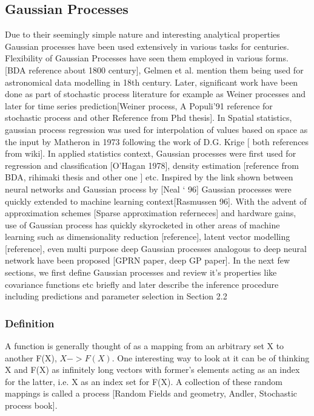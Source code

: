 \subsection{Gaussian Processes}
Due to their seemingly simple nature and interesting analytical properties Gaussian processes have been used extensively in various tasks for centuries. Flexibility of Gaussian Processes have seen them employed in various forms. [BDA reference about 1800 century], Gelmen et al. mention them being used for astronomical data modelling in 18th century. Later, significant work have been done as part of stochastic process literature for example as Weiner processes and later for time series prediction[Weiner process, A Populi’91 reference for stochastic process and other Reference from Phd thesis]. In Spatial statistics, gaussian process regression was used for interpolation of values based on space as the input by Matheron in 1973 following the work of D.G. Krige [ both references from wiki]. In applied statistics context, Gaussian processes were first used for regression and classification [O’Hagan 1978], density estimation [reference from BDA, rihimaki thesis and other one ] etc. Inspired by the link shown between neural networks and Gaussian process by [Neal ‘ 96] Gaussian processes were quickly extended to machine learning context[Rasmussen 96]. With the advent of approximation schemes [Sparse approximation referneces] and hardware gains, use of Gaussian process has quickly skyrocketed in other areas of machine learning such as dimensionality reduction [reference], latent vector modelling [reference], even multi purpose deep Gaussian processes analogous to deep neural network have been proposed [GPRN paper, deep GP paper].  In the next few sections, we first define Gaussian processes and review it's properties like covariance functions etc briefly and later describe the inference procedure including  predictions and parameter selection in Section 2.2 
\subsubsection{Definition}
A function is generally thought of as a mapping from an arbitrary set X to another F(X), $X -> F(X)$. One interesting way to look at it can be of thinking X and F(X) as infinitely long vectors with former’s elements acting as an index for the latter, i.e. X as an index set for F(X).  A collection of these random mappings is called a process [Random Fields and geometry, Andler, Stochastic process book]. 


